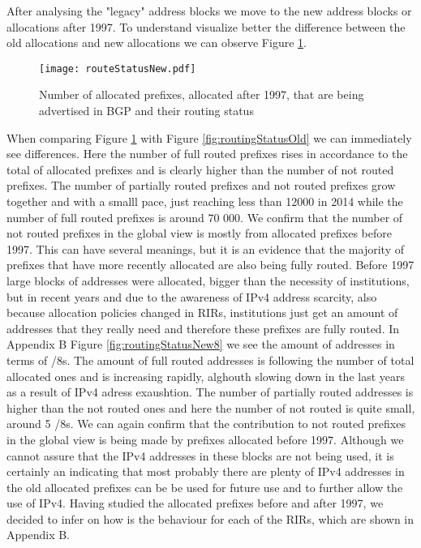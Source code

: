 \documentclass[11pt,a4paper]{scrreprt}
\begin{document}
After analysing the "legacy" address blocks we move to the new address blocks or allocations after 1997. To understand visualize better the difference between the old allocations and new allocations we can observe Figure \ref{fig:routingStatusNew}.

\begin{figure}[!h]
\centering
\texttt{[image: routeStatusNew.pdf]}
\caption{Number of allocated prefixes, allocated after 1997, that are being advertised in BGP and their routing status}
\label{fig:routingStatusNew}
\end{figure}

When comparing Figure \ref{fig:routingStatusNew} with Figure \ref{fig:routingStatusOld} we can immediately see differences. Here the number of full routed prefixes rises in accordance to the total of allocated prefixes and is clearly higher than the number of not routed prefixes. The number of partially routed prefixes and not routed prefixes grow together and with a smalll pace, just reaching less than 12000 in 2014 while the number of full routed prefixes is around 70 000. We confirm that the number of not routed prefixes in the global view is mostly from allocated prefixes before 1997. This can have several meanings, but it is an evidence that the majority of prefixes that have more recently allocated are also being fully routed. Before 1997 large blocks of addresses were allocated, bigger than the necessity of institutions, but in recent years and due to the awareness of IPv4 address scarcity, also because allocation policies changed in RIRs, institutions just get an amount of addresses that they really need and therefore these prefixes are fully routed. 
In Appendix B Figure \ref{fig:routingStatusNew8} we see the amount of addresses in terms of /8s. The amount of full routed addresses is following the number of total allocated ones and is increasing rapidly, alghouth slowing down in the last years as a result of IPv4 adress exaushtion. The number of partially routed addresses is higher than the not routed ones and here the number of not routed is quite small, around 5 /8s. We can again confirm that the contribution to not routed prefixes in the global view is being made by prefixes allocated before 1997. Although we cannot assure that the IPv4 addresses in these blocks are not being used, it is certainly an indicating that most probably there are plenty of IPv4 addresses in the old allocated prefixes can be be used for future use and to further allow the use of IPv4.
Having studied the allocated prefixes before and after 1997, we decided to infer on how is the behaviour for each of the RIRs, which are shown in Appendix B. 
\end{document}
